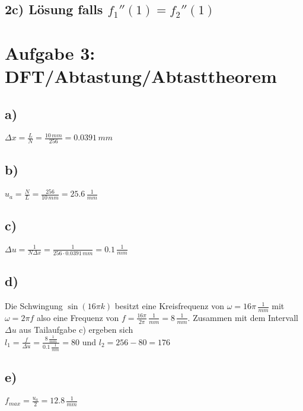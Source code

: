 \documentclass[a4paper,11pt,oneside]{scrartcl}
\begin{document}
\subsection*{2c) Lösung falls $f_1''(1) = f_2''(1)$}


\newpage

\section*{Aufgabe 3: DFT/Abtastung/Abtasttheorem}
\subsection*{a)}

$\Delta x=\frac{L}{N}=\frac{10\,mm}{256}=0.0391\,mm$

\subsection*{b)}

$u_{a}=\frac{N}{L}=\frac{256}{10\,mm}=25.6\,\frac{1}{mm}$

\subsection*{c)}

$\Delta u=\frac{1}{N\Delta x}=\frac{1}{256\cdot0.0391\,mm}= 0.1\,\frac{1}{mm}$

\subsection*{d)}

Die Schwingung $\sin(16\pi k)$ besitzt eine Kreisfrequenz von $\omega=16\pi\,\frac{1}{mm}$ mit $\omega=2\pi f$ also eine Frequenz von $f=\frac{16\pi}{2\pi}\,\frac{1}{mm}=8\,\frac{1}{mm}$. Zusammen mit dem Intervall $\Delta u$ aus Tailaufgabe c) ergeben sich \\

$l_{1}=\frac{f}{\Delta u}=\frac{8\,\frac{1}{mm}}{0.1\,\frac{1}{mm}}=80$ und $l_{2}=256-80=176$

\subsection*{e)}

$f_{max}=\frac{u_{a}}{2}=12.8\,\frac{1}{mm}$
\end{document}
